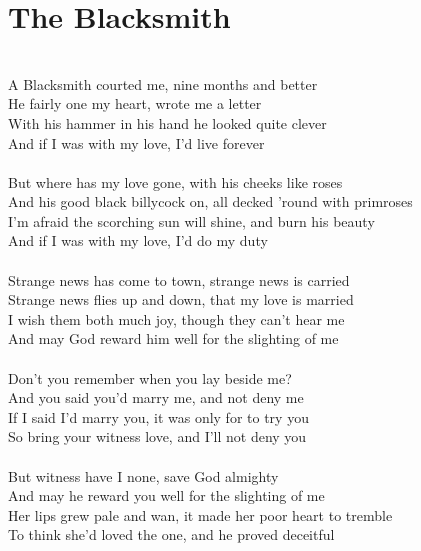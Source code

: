\documentclass[letterpaper,14pt]{extarticle}
\begin{document}
\section{The Blacksmith}
\noindent
\\A Blacksmith courted me, nine months and better
\\He fairly one my heart, wrote me a letter
\\With his hammer in his hand he looked quite clever
\\And if I was with my love, I'd live forever
\\
\\But where has my love gone, with his cheeks like roses
\\And his good black billycock on, all decked 'round with primroses
\\I'm afraid the scorching sun will shine, and burn his beauty
\\And if I was with my love, I'd do my duty
\\
\\Strange news has come to town, strange news is carried
\\Strange news flies up and down, that my love is married
\\I wish them both much joy, though they can't hear me
\\And may God reward him well for the slighting of me
\\
\\Don't you remember when you lay beside me?
\\And you said you'd marry me, and not deny me
\\If I said I'd marry you, it was only for to try you
\\So bring your witness love, and I'll not deny you
\\
\\But witness have I none, save God almighty
\\And may he reward you well for the slighting of me
\\Her lips grew pale and wan, it made her poor heart to tremble
\\To think she'd loved the one, and he proved deceitful
\end{document}
